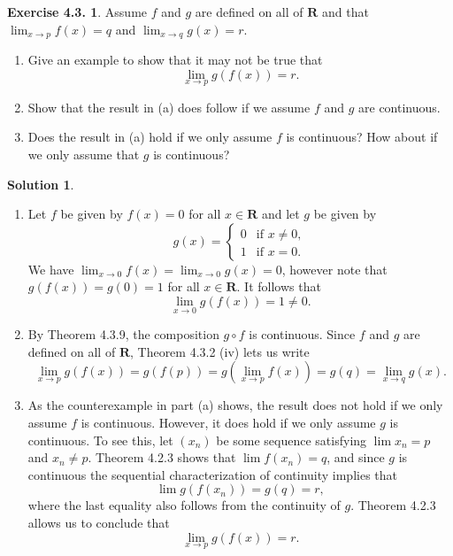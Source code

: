 \documentclass[12pt]{article}
\theoremstyle{definition}
\theoremstyle{exercise}
\newtheorem{exercise}{Exercise 4.3.}
\theoremstyle{solution}
\newtheorem*{solution}{Solution}
\newcommand{\R}{\mathbf{R}}
\begin{document}
\begin{exercise}
\label{ex:4}
    Assume \( f \) and \( g \) are defined on all of \( \R \) and that \( \lim_{x \to p} f(x) = q \) and \( \lim_{x \to q} g(x) = r \).
    \begin{enumerate}
        \item Give an example to show that it may not be true that
        \[
            \lim_{x \to p} g(f(x)) = r.
        \]

        \item Show that the result in (a) does follow if we assume \( f \) and \( g \) are continuous.

        \item Does the result in (a) hold if we only assume \( f \) is continuous? How about if we only assume that \( g \) is continuous?
    \end{enumerate}
\end{exercise}

\begin{solution}
    \begin{enumerate}
        \item Let \( f \) be given by \( f(x) = 0 \) for all \( x \in \R \) and let \( g \) be given by
        \[
            g(x) = \begin{cases}
                0 & \text{if } x \neq 0, \\
                1 & \text{if } x = 0.
            \end{cases}
        \]
        We have \( \lim_{x \to 0} f(x) = \lim_{x \to 0} g(x) = 0 \), however note that \( g(f(x)) = g(0) = 1 \) for all \( x \in \R \). It follows that
        \[
            \lim_{x \to 0} g(f(x)) = 1 \neq 0.
        \]

        \item By Theorem 4.3.9, the composition \( g \circ f \) is continuous. Since \( f \) and \( g \) are defined on all of \( \R \), Theorem 4.3.2 (iv) lets us write
        \[
            \lim_{x \to p} g(f(x)) = g(f(p)) = g \left( \lim_{x \to p} f(x) \right) = g(q) = \lim_{x \to q} g(x).
        \]

        \item As the counterexample in part (a) shows, the result does not hold if we only assume \( f \) is continuous. However, it does hold if we only assume \( g \) is continuous. To see this, let \( (x_n) \) be some sequence satisfying \( \lim x_n = p \) and \( x_n \neq p \). Theorem 4.2.3 shows that \( \lim f(x_n) = q \), and since \( g \) is continuous the sequential characterization of continuity implies that
        \[
            \lim g(f(x_n)) = g(q) = r,
        \]
        where the last equality also follows from the continuity of \( g \). Theorem 4.2.3 allows us to conclude that
        \[
            \lim_{x \to p} g(f(x)) = r.
        \]
    \end{enumerate}
\end{solution}
\end{document}
